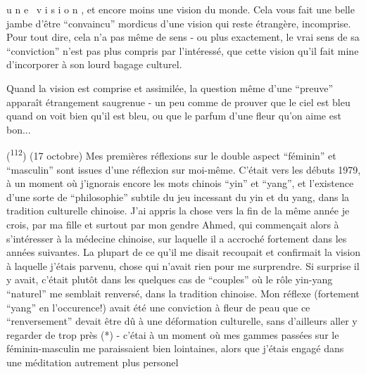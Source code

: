 
u n e \ v i s i o n , et encore moins une vision du monde. Cela vous fait une belle jambe d'être ``convaincu'' mordicus d'une vision qui reste étrangère, incomprise. Pour tout dire, cela n'a pas même de sens - ou plus exactement, le vrai sens de sa ``conviction'' n'est pas plus compris par l'intéressé, que cette vision qu'il fait mine d'incorporer à son lourd bagage culturel.

Quand la vision est comprise et assimilée, la question même d'une ``preuve'' apparaît étrangement saugrenue - un peu comme de prouver que le ciel est bleu quand on voit bien qu'il est bleu, ou que le parfum d'une fleur qu'on aime est bon...


(\textsuperscript{112}) (17 octobre) Mes premières réflexions sur le double aspect ``féminin'' et ``masculin'' sont issues d'une réflexion sur moi-même. C'était vers les débuts 1979, à un moment où j'ignorais encore les mots chinois ``yin'' et ``yang'', et l'existence d'une sorte de ``philosophie'' subtile du jeu incessant du yin et du yang, dans la tradition culturelle chinoise. J'ai appris la chose vers la fin de la même année je crois, par ma fille et surtout par mon gendre Ahmed, qui commençait alors à s'intéresser à la médecine chinoise, sur laquelle il a accroché fortement dans les années suivantes. La plupart de ce qu'il me disait recoupait et confirmait la vision à laquelle j'étais parvenu, chose qui n'avait rien pour me surprendre. Si surprise il y avait, c'était plutôt dans les quelques cas de ``couples'' où le rôle yin-yang ``naturel'' me semblait renversé, dans la tradition chinoise. Mon réflexe (fortement ``yang'' en l'occurence!) avait été une conviction à fleur de peau que ce ``renversement'' devait être dû à une déformation culturelle, sans d'ailleurs aller y regarder de trop près (*) - c'étai à un moment où mes gammes passées sur le féminin-masculin me paraissaient bien lointaines, alors que j'étais engagé dans une méditation autrement plus personel\unsure{-}


